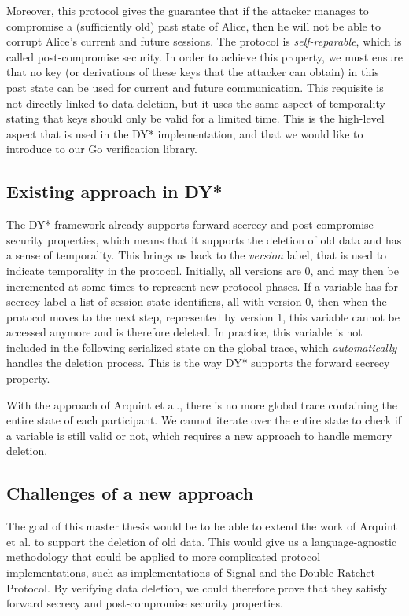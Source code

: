 \documentclass{article}
\begin{document}
Moreover, this protocol gives the guarantee that if the attacker manages to compromise a (sufficiently old) past state of Alice, then he will not be able to corrupt Alice's current and future sessions. The protocol is \textit{self-reparable}, which is called post-compromise security. In order to achieve this property, we must ensure that no key (or derivations of these keys that the attacker can obtain) in this past state can be used for current and future communication. This requisite is not directly linked to data deletion, but it uses the same aspect of temporality stating that keys should only be valid for a limited time. This is the high-level aspect that is used in the DY* implementation, and that we would like to introduce to our Go verification library.

\subsection{Existing approach in DY*}
\label{sec:existing-approach-dy}

The DY* framework already supports forward secrecy and post-compromise security properties, which means that it supports the deletion of old data and has a sense of temporality.
This brings us back to the \textit{version} label, that is used to indicate temporality in the protocol. Initially, all versions are 0, and may then be incremented at some times to represent new protocol phases. 
If a variable has for secrecy label a list of session state identifiers, all with version 0, then when the protocol moves to the next step, represented by version 1, this variable cannot be accessed anymore and is therefore deleted. In practice, this variable is not included in the following serialized state on the global trace, which \textit{automatically} handles the deletion process. This is the way DY* supports the forward secrecy property.

With the approach of Arquint et al., there is no more global trace containing the entire state of each participant. We cannot iterate over the entire state to check if a variable is still valid or not, which requires a new approach to handle memory deletion.


\subsection{Challenges of a new approach}

The goal of this master thesis would be to be able to extend the work of Arquint et al. to support the deletion of old data. This would give us a language-agnostic methodology that could be applied to more complicated protocol implementations, such as implementations of Signal and the Double-Ratchet Protocol. By verifying data deletion, we could therefore prove that they satisfy forward secrecy and post-compromise security properties.
\end{document}
